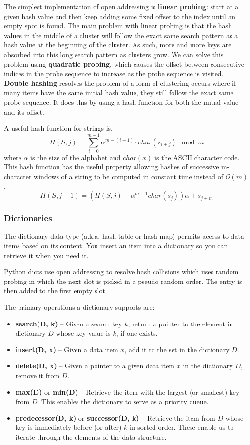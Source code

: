 \documentclass{article}
\newcommand{\bigO}{\mathcal{O}}
\begin{document}
    The simplest implementation of open addressing is \textbf{linear probing}: start at a given hash value and then keep adding some fixed offset to the index until an empty spot is found. The main problem with linear probing is that the hash values in the middle of a cluster will follow the exact same search pattern as a hash value at the beginning of the cluster. As such, more and more keys are absorbed into this long search pattern as clusters grow. We can solve this problem using \textbf{quadratic probing}, which causes the offset between consecutive indices in the probe sequence to increase as the probe sequence is visited. \textbf{Double hashing} resolves the problem of a form of clustering occurs where if many items have the same initial hash value, they still follow the exact same probe sequence. It does this by using a hash function for both the initial value and its offset.

    A useful hash function for strings is,
    \[
        H(S,j) = \sum_{i=0}^{m-1} \alpha^{m-(i+1)} \cdot char(s_{i+j}) \mod m
    \]
    where $\alpha$ is the size of the alphabet and $char(x)$ is the ASCII character code. This hash function has the useful property allowing hashes of successive m-character windows of a string to be computed in constant time instead of $\bigO(m)$.
    \[
        H(S, j+1) = (H(S,j) - \alpha^{m-1}char(s_j))\alpha + s_{j+m}
    \]
    
    \subsubsection{Dictionaries}
    The dictionary data type (a.k.a. hash table or hash map) permits access to data items based on its content. You insert an item into a dictionary so you can retrieve it when you need it.
    
    Python dicts use open addressing to resolve hash collisions which uses random probing in which the next slot is picked in a pseudo random order. The entry is then added to the first empty slot
    
    The primary operations a dictionary supports are:
    \begin{itemize}
        \item  \textbf{search(D, k)} – Given a search key $k$, return a pointer to the element in dictionary $D$ whose key value is $k$, if one exists.
        \item \textbf{insert(D, x)} – Given a data item $x$, add it to the set in the dictionary $D$.
        \item \textbf{delete(D, x)} – Given a pointer to a given data item $x$ in the dictionary $D$, remove it from $D$.
        \item \textbf{max(D)} or \textbf{min(D)} – Retrieve the item with the largest (or smallest) key from $D$. This enables the dictionary to serve as a priority queue.
        \item \textbf{predecessor(D, k)} or \textbf{successor(D, k)} – Retrieve the item from $D$ whose key is immediately before (or after) $k$ in sorted order. These enable us to iterate through the elements of the data structure.
    \end{itemize}
    
\end{document}
